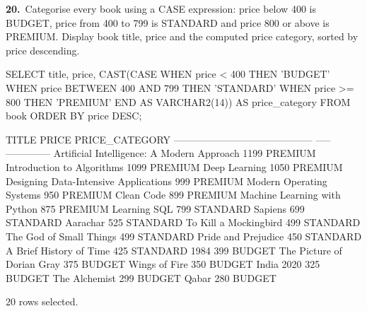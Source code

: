 \noindent\begin{minipage}{\linewidth}
\begingroup{}
{\fontsize{14}{17}\selectfont\textbf{20.}}\ Categorise every book using a CASE expression: price below 400 is BUDGET, price from 400 to 799 is STANDARD and price 800 or above is PREMIUM. Display book title, price and the computed price category, sorted by price descending.\par
\endgroup\vspace{12pt}


\begin{sqlcode}
SELECT title, price,
       CAST(CASE WHEN price < 400 THEN 'BUDGET'
                 WHEN price BETWEEN 400 AND 799 THEN 'STANDARD'
                 WHEN price >= 800 THEN 'PREMIUM'
            END AS VARCHAR2(14)) AS price_category
FROM book
ORDER BY price DESC;
\end{sqlcode}

\vspace{18pt}


\begin{sqlout}[fontsize=\small]
TITLE                                       PRICE  PRICE_CATEGORY
------------------------------------------  -----  --------------
Artificial Intelligence: A Modern Approach   1199  PREMIUM
Introduction to Algorithms                   1099  PREMIUM
Deep Learning                                1050  PREMIUM
Designing Data-Intensive Applications         999  PREMIUM
Modern Operating Systems                      950  PREMIUM
Clean Code                                    899  PREMIUM
Machine Learning with Python                  875  PREMIUM
Learning SQL                                  799  STANDARD
Sapiens                                       699  STANDARD
Aarachar                                      525  STANDARD
To Kill a Mockingbird                         499  STANDARD
The God of Small Things                       499  STANDARD
Pride and Prejudice                           450  STANDARD
A Brief History of Time                       425  STANDARD
1984                                          399  BUDGET
The Picture of Dorian Gray                    375  BUDGET
Wings of Fire                                 350  BUDGET
India 2020                                    325  BUDGET
The Alchemist                                 299  BUDGET
Qabar                                         280  BUDGET

20 rows selected.
\end{sqlout}
\end{minipage}\par\vspace{24pt}


